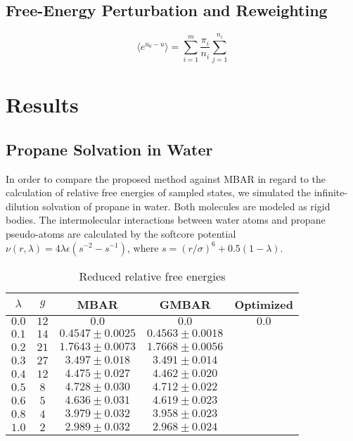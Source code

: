\documentclass[aip,jcp,reprint,amsmath,amssymb]{revtex4-1}
\begin{document}
\subsection{Free-Energy Perturbation and Reweighting}

\begin{equation*}
\langle e^{u_0 - u} \rangle = \sum_{i=1}^m \frac{\pi_i}{n_i}\sum_{j=1}^{n_i} 
\end{equation*}

\section{Results}

\subsection{Propane Solvation in Water}

In order to compare the proposed method against MBAR in regard to the calculation of relative free energies of sampled states, we simulated the infinite-dilution solvation of propane in water. Both molecules are modeled as rigid bodies. The intermolecular interactions between water atoms and propane pseudo-atoms are calculated by the softcore potential\cite{Beutler_1994} $\nu(r,\lambda) = 4\lambda\epsilon(s^{-2} - s^{-1})$, where $s = (r/\sigma)^6 + 0.5 (1-\lambda)$.

\begin{table}
\caption{Reduced relative free energies}
\label{table:propane solvation}
\begin{ruledtabular}
\begin{tabular}{ccccc}
$\lambda$ & $g$ & MBAR & GMBAR & Optimized \\
\hline
$0.0$ & $12$ & $0.0$ & $0.0$ & $0.0$ \\
$0.1$ & $14$ & $0.4547 \pm 0.0025$ & $0.4563 \pm 0.0018$ \\
$0.2$ & $21$ & $1.7643 \pm 0.0073$ & $1.7668 \pm 0.0056$ \\
$0.3$ & $27$ &  $3.497 \pm 0.018$  &  $3.491 \pm 0.014$ \\
$0.4$ & $12$ &  $4.475 \pm 0.027$  &  $4.462 \pm 0.020$ \\
$0.5$ & $8$  &  $4.728 \pm 0.030$  &  $4.712 \pm 0.022$ \\
$0.6$ & $5$  &  $4.636 \pm 0.031$  &  $4.619 \pm 0.023$ \\
$0.8$ & $4$  &  $3.979 \pm 0.032$  &  $3.958 \pm 0.023$ \\
$1.0$ & $2$  &  $2.989 \pm 0.032$  &  $2.968 \pm 0.024$
\end{tabular}
\end{ruledtabular}
\end{table}
\end{document}
